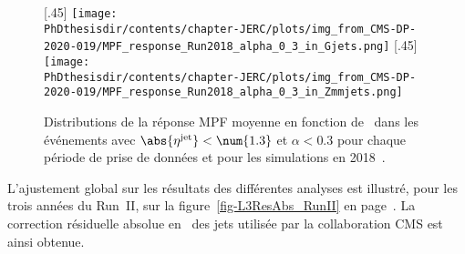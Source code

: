 \begin{figure}[h]
\centering
{}[.45\textwidth]
{\texttt{[image: \\PhDthesisdir/contents/chapter-JERC/plots/img\_from\_CMS-DP-2020-019/MPF\_response\_Run2018\_alpha\_0\_3\_in\_Gjets.png]}}
\hfill
{}[.45\textwidth]
{\texttt{[image: \\PhDthesisdir/contents/chapter-JERC/plots/img\_from\_CMS-DP-2020-019/MPF\_response\_Run2018\_alpha\_0\_3\_in\_Zmmjets.png]}}
\caption[Distributions de la réponse MPF moyenne en fonction de \pT\ en 2018.]{Distributions de la réponse MPF moyenne en fonction de \pT\ dans les événements avec $\abs{\eta^\text{jet}}<\num{1.3}$ et $\alpha<\num{0.3}$ pour chaque période de prise de données et pour les simulations en 2018~\cite{CMS-DP-2020-019}.}
\label{fig-chapter-JERC-section-JES-subsec-results-response_eta0013_alpha_0_3_2018}
\end{figure}
\par L'ajustement global sur les résultats des différentes analyses est illustré, pour les trois années du Run~II, sur la figure~\ref{fig-L3ResAbs_RunII} en page~\pageref{fig-L3ResAbs_RunII}.
La correction résiduelle absolue en \pT\ des jets utilisée par la collaboration CMS est ainsi obtenue.
%
%
%